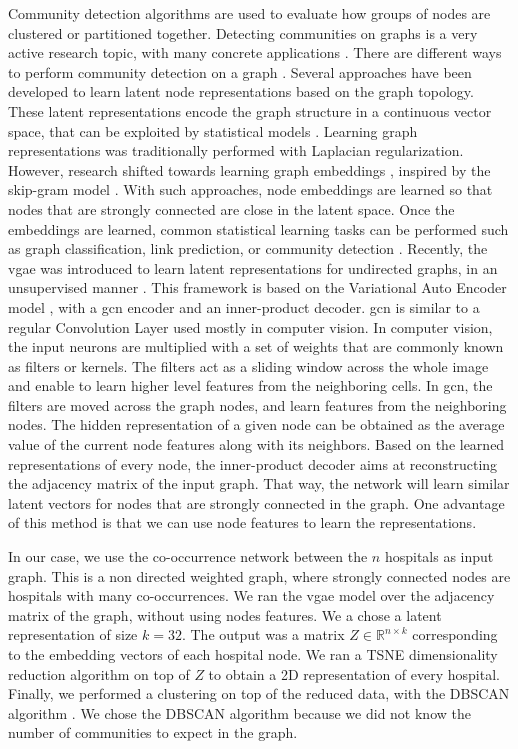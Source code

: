 Community detection algorithms are used to evaluate how groups of nodes are
clustered or partitioned together. Detecting communities on graphs is a very
active research topic, with many concrete applications
\cite{fortunato_community_2010}. There are different ways to perform community
detection on a graph \cite{hamilton_representation_2018}. Several approaches
have been developed to learn latent node representations based on the graph
topology. These latent representations encode the graph structure in a
continuous vector space, that can be exploited by statistical models
\cite{perozzi_deepwalk_2014}. Learning graph representations was traditionally
performed with Laplacian regularization. However, research shifted towards
learning graph embeddings \cite{kipf_semi-supervised_2017}, inspired by the
skip-gram model \cite{mikolov_distributed_2013}. With such approaches, node
embeddings are learned so that nodes that are strongly connected are close in
the latent space. Once the embeddings are learned, common statistical learning
tasks can be performed such as graph classification, link prediction, or
community detection \cite{hamilton_representation_2018}. Recently, the \ac{vgae}
was introduced to learn latent representations for undirected graphs, in an
unsupervised manner \cite{kipf_variational_2016}. This framework is based on the
Variational Auto Encoder model \cite{kingma_auto-encoding_2014}, with a \ac{gcn}
\cite{kipf_semi-supervised_2017} encoder and an inner-product decoder. \ac{gcn}
is similar to a regular Convolution Layer used mostly in computer vision. In
computer vision, the input neurons are multiplied with a set of weights that are
commonly known as filters or kernels. The filters act as a sliding window across
the whole image and enable to learn higher level features from the neighboring
cells. In \ac{gcn}, the filters are moved across the graph nodes, and learn
features from the neighboring nodes. The hidden representation of a given node
can be obtained as the average value of the current node features along with its
neighbors. Based on the learned representations of every node, the inner-product
decoder aims at reconstructing the adjacency matrix of the input graph. That
way, the network will learn similar latent vectors for nodes that are strongly
connected in the graph. One advantage of this method is that we can use node
features to learn the representations.

In our case, we use the co-occurrence network between the $n$ hospitals as input
graph. This is a non directed weighted graph, where strongly connected nodes are
hospitals with many co-occurrences. We ran the \ac{vgae} model over the
adjacency matrix of the graph, without using nodes features. We a chose a latent
representation  of size $k=32$. The output was a matrix
$Z \in \mathbb{R}^{n \times k }$ corresponding to the embedding vectors
of each hospital node. We ran a TSNE \cite{van_der_maaten_viualizing_2008}
dimensionality reduction algorithm on top of $Z$ to obtain a 2D
representation of every hospital. Finally, we performed a clustering on top of
the reduced data, with the DBSCAN algorithm \cite{ester_density-based_1996}.
We chose the DBSCAN algorithm because we did not know the number of communities
to expect in the graph.


